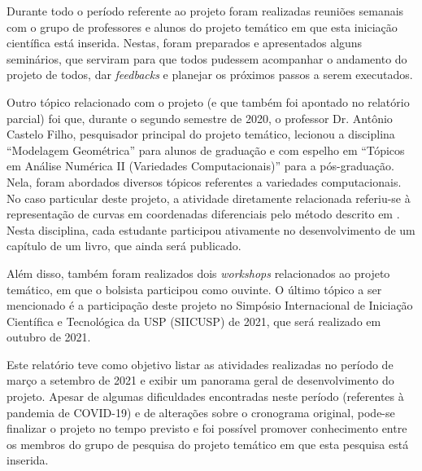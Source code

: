 Durante todo o período referente ao projeto foram realizadas reuniões semanais com o grupo de professores e alunos do projeto temático em que esta iniciação científica está inserida. Nestas, foram preparados e apresentados alguns seminários, que serviram para que todos pudessem acompanhar o andamento do projeto de todos, dar \textit{feedbacks} e planejar os próximos passos a serem executados.

Outro tópico relacionado com o projeto (e que também foi apontado no relatório parcial) foi que, durante o segundo semestre de 2020, o professor Dr. Antônio Castelo Filho, pesquisador principal do projeto temático, lecionou a disciplina ``Modelagem Geométrica'' para alunos de graduação e com espelho em ``Tópicos em Análise Numérica II (Variedades Computacionais)'' para a pós-graduação. Nela, foram abordados diversos tópicos referentes a variedades computacionais. No caso particular deste projeto, a atividade diretamente relacionada referiu-se à representação de curvas em coordenadas diferenciais pelo método descrito em . Nesta disciplina, cada estudante participou ativamente no desenvolvimento de um capítulo de um livro, que ainda será publicado.

Além disso, também foram realizados dois \textit{workshops} relacionados ao projeto temático, em que o bolsista participou como ouvinte. O último tópico a ser mencionado é a participação deste projeto no Simpósio Internacional de Iniciação Científica e Tecnológica da USP (SIICUSP) de 2021, que será realizado em outubro de 2021.

Este relatório teve como objetivo listar as atividades realizadas no período de março a setembro de 2021 e exibir um panorama geral de desenvolvimento do projeto. Apesar de algumas dificuldades encontradas neste período (referentes à pandemia de COVID-19) e de alterações sobre o cronograma original, pode-se finalizar o projeto no tempo previsto e foi possível promover conhecimento entre os membros do grupo de pesquisa do projeto temático em que esta pesquisa está inserida.